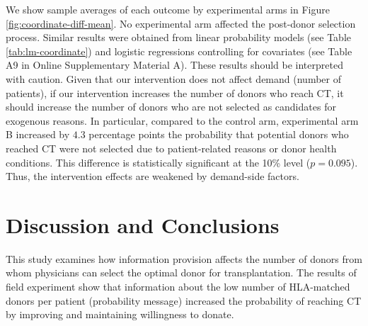 \documentclass[12pt, a4paper]{article}
\begin{document}
We show sample averages of each outcome by experimental arms in Figure \ref{fig:coordinate-diff-mean}. No experimental arm affected the post-donor selection process. Similar results were obtained from linear probability models (see Table \ref{tab:lm-coordinate}) and logistic regressions controlling for covariates (see Table A9 in Online Supplementary Material A). These results should be interpreted with caution. Given that our intervention does not affect demand (number of patients), if our intervention increases the number of donors who reach CT, it should increase the number of donors who are not selected as candidates for exogenous reasons. In particular, compared to the control arm, experimental arm B increased by \(4.3\) percentage points the probability that potential donors who reached CT were not selected due to patient-related reasons or donor health conditions. This difference is statistically significant at the 10\% level (\(p = 0.095\)). Thus, the intervention effects are weakened by demand-side factors.

\hypertarget{conclusion}{%
\section{Discussion and Conclusions}\label{conclusion}}

This study examines how information provision affects the number of donors from whom physicians can select the optimal donor for transplantation. The results of field experiment show that information about the low number of HLA-matched donors per patient (probability message) increased the probability of reaching CT by improving and maintaining willingness to donate.
\end{document}
